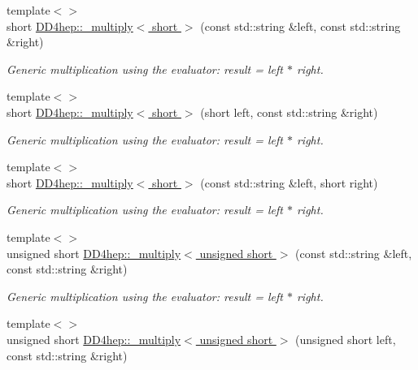 \begin{DoxyCompactItemize}
{\footnotesize template$<$$>$ }\\short \hyperlink{group___d_d4_h_e_p___g_e_o_m_e_t_r_y_ga48c9f3472a9749bd235effa32a604c94}{DD4hep::\_\-multiply$<$ short $>$} (const std::string \&left, const std::string \&right)
\begin{DoxyCompactList}\small\item\em Generic multiplication using the evaluator: result = left $\ast$ right. \item\end{DoxyCompactList}\item 
{\footnotesize template$<$$>$ }\\short \hyperlink{group___d_d4_h_e_p___g_e_o_m_e_t_r_y_gafec1086e2f2eb1e13a76d82673b16cad}{DD4hep::\_\-multiply$<$ short $>$} (short left, const std::string \&right)
\begin{DoxyCompactList}\small\item\em Generic multiplication using the evaluator: result = left $\ast$ right. \item\end{DoxyCompactList}\item 
{\footnotesize template$<$$>$ }\\short \hyperlink{group___d_d4_h_e_p___g_e_o_m_e_t_r_y_ga4e0e6a70c55ef60889f83a8c18d86291}{DD4hep::\_\-multiply$<$ short $>$} (const std::string \&left, short right)
\begin{DoxyCompactList}\small\item\em Generic multiplication using the evaluator: result = left $\ast$ right. \item\end{DoxyCompactList}\item 
{\footnotesize template$<$$>$ }\\unsigned short \hyperlink{group___d_d4_h_e_p___g_e_o_m_e_t_r_y_ga6482dc630996278ced2ba26265fa93be}{DD4hep::\_\-multiply$<$ unsigned short $>$} (const std::string \&left, const std::string \&right)
\begin{DoxyCompactList}\small\item\em Generic multiplication using the evaluator: result = left $\ast$ right. \item\end{DoxyCompactList}\item 
{\footnotesize template$<$$>$ }\\unsigned short \hyperlink{group___d_d4_h_e_p___g_e_o_m_e_t_r_y_gacac2a6cbdf2e86db855804622da26514}{DD4hep::\_\-multiply$<$ unsigned short $>$} (unsigned short left, const std::string \&right)

\end{DoxyCompactItemize}
